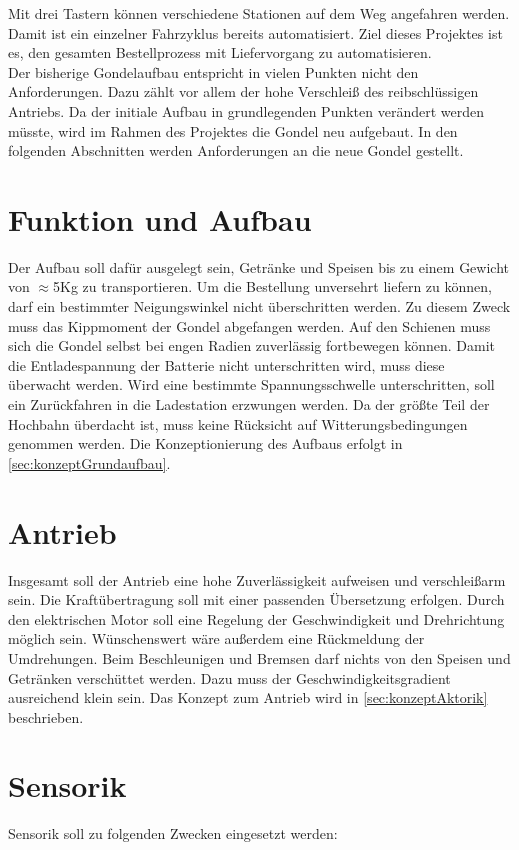 Mit drei Tastern können verschiedene Stationen auf dem Weg angefahren werden. Damit ist ein einzelner Fahrzyklus bereits automatisiert. Ziel dieses Projektes ist es, den gesamten Bestellprozess mit Liefervorgang zu automatisieren. \\

Der bisherige Gondelaufbau entspricht in vielen Punkten nicht den Anforderungen. Dazu zählt vor allem der hohe Verschleiß des reibschlüssigen Antriebs. Da der initiale Aufbau in grundlegenden Punkten verändert werden müsste, wird im Rahmen des Projektes die Gondel neu aufgebaut. In den folgenden Abschnitten werden Anforderungen an die neue Gondel gestellt. 

\section{Funktion und Aufbau}
\label{sec:anforderungFunktionUndAufbau}
Der Aufbau soll dafür ausgelegt sein, Getränke und Speisen bis zu einem Gewicht von $\approx$5Kg zu transportieren. Um die Bestellung unversehrt liefern zu können, darf ein bestimmter Neigungswinkel nicht überschritten werden. Zu diesem Zweck muss das Kippmoment der Gondel abgefangen werden. Auf den Schienen muss sich die Gondel selbst bei engen Radien zuverlässig fortbewegen können. Damit die Entladespannung der Batterie nicht unterschritten wird, muss diese überwacht werden. Wird eine bestimmte Spannungsschwelle unterschritten, soll ein Zurückfahren in die Ladestation erzwungen werden. Da der größte Teil der Hochbahn überdacht ist, muss keine Rücksicht auf Witterungsbedingungen genommen werden. Die Konzeptionierung des Aufbaus erfolgt in \autoref{sec:konzeptGrundaufbau}.
\newpage


\section{Antrieb}
\label{sec:anforderungAntrieb}
Insgesamt soll der Antrieb eine hohe Zuverlässigkeit aufweisen und verschleißarm sein. 
Die Kraftübertragung soll mit einer passenden Übersetzung erfolgen. Durch den elektrischen Motor soll eine Regelung der Geschwindigkeit und Drehrichtung möglich sein. Wünschenswert wäre außerdem eine Rückmeldung der Umdrehungen. Beim Beschleunigen und Bremsen darf nichts von den Speisen und Getränken verschüttet werden. Dazu muss der Geschwindigkeitsgradient ausreichend klein sein. Das Konzept zum Antrieb wird in \autoref{sec:konzeptAktorik} beschrieben. 


\section{Sensorik}
\label{sec:anforderungSensorik}
Sensorik soll zu folgenden Zwecken eingesetzt werden: 


